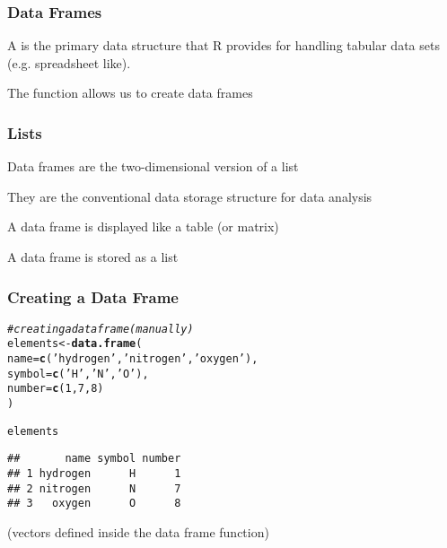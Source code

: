 \documentclass[12pt]{beamer}\usepackage[]{graphicx}\usepackage[]{color}
\makeatletter
\newcommand{\hlnum}[1]{\textcolor[rgb]{0.686,0.059,0.569}{#1}}%
\newcommand{\hlstr}[1]{\textcolor[rgb]{0.192,0.494,0.8}{#1}}%
\newcommand{\hlcom}[1]{\textcolor[rgb]{0.678,0.584,0.686}{\textit{#1}}}%
\newcommand{\hlstd}[1]{\textcolor[rgb]{0.345,0.345,0.345}{#1}}%
\newcommand{\hlkwb}[1]{\textcolor[rgb]{0.69,0.353,0.396}{#1}}%
\newcommand{\hlkwc}[1]{\textcolor[rgb]{0.333,0.667,0.333}{#1}}%
\newcommand{\hlkwd}[1]{\textcolor[rgb]{0.737,0.353,0.396}{\textbf{#1}}}%
\newenvironment{kframe}{%
 \def\at@end@of@kframe{}%
 \ifinner\ifhmode%
  \def\at@end@of@kframe{\end{minipage}}%
  \begin{minipage}{\columnwidth}%
 \fi\fi%
 \def\FrameCommand##1{\hskip\@totalleftmargin \hskip-\fboxsep
 \colorbox{shadecolor}{##1}\hskip-\fboxsep
     \hskip-\linewidth \hskip-\@totalleftmargin \hskip\columnwidth}%
 \MakeFramed {\advance\hsize-\width
   \@totalleftmargin\z@ \linewidth\hsize
   \@setminipage}}%
 {\par\unskip\endMakeFramed%
 \at@end@of@kframe}
\newenvironment{knitrout}{}{} %
\makeatother
\begin{document}

\begin{frame}
\frametitle{Data Frames}

A {\hilit {}} is the primary data structure that R provides for handling tabular data sets (e.g. spreadsheet like).
\eb

The {\hilit {}} function allows us to create data frames 
\eb

\end{frame}


\begin{frame}
\frametitle{Lists}

\bi 
  \item Data frames are the two-dimensional version of a list
  \item They are the conventional data storage structure for data analysis
  \item A data frame is displayed like a table (or matrix)
  \item A data frame is stored as a list
\ei
\end{frame}


\begin{frame}[fragile]
\frametitle{Creating a Data Frame}

\begin{knitrout}\footnotesize
{}\color{fgcolor}\begin{kframe}
\begin{alltt}
\hlcom{# creating a data frame (manually)}
\hlstd{elements} \hlkwb{<-} \hlkwd{data.frame}\hlstd{(}
  \hlkwc{name} \hlstd{=} \hlkwd{c}\hlstd{(}\hlstr{'hydrogen'}\hlstd{,} \hlstr{'nitrogen'}\hlstd{,} \hlstr{'oxygen'}\hlstd{),}
  \hlkwc{symbol} \hlstd{=} \hlkwd{c}\hlstd{(}\hlstr{'H'}\hlstd{,} \hlstr{'N'}\hlstd{,} \hlstr{'O'}\hlstd{),}
  \hlkwc{number} \hlstd{=} \hlkwd{c}\hlstd{(}\hlnum{1}\hlstd{,} \hlnum{7}\hlstd{,} \hlnum{8}\hlstd{)}
\hlstd{)}

\hlstd{elements}
\end{alltt}
\begin{verbatim}
##       name symbol number
## 1 hydrogen      H      1
## 2 nitrogen      N      7
## 3   oxygen      O      8
\end{verbatim}
\end{kframe}
\end{knitrout}

(vectors defined inside the data frame function)

\end{frame}
\end{document}
